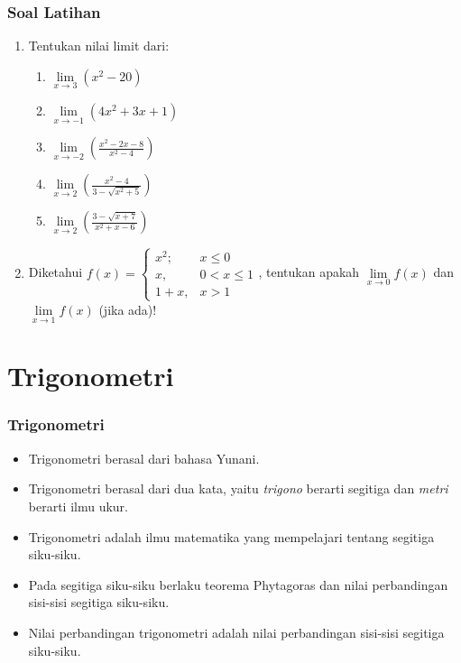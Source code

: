 \documentclass[pdflatex,compress,mathserif]{beamer}
\begin{document}
		\begin{frame}
			\frametitle{Soal Latihan}
			\begin{enumerate}
				\item Tentukan nilai limit dari:
				\begin{enumerate}
					\item $\lim\limits_{x \rightarrow 3} \left( x^2 - 20 \right)$
					\item $\lim\limits_{x \rightarrow -1} \left( 4x^2 + 3x + 1 \right)$
					\item $\lim\limits_{x \rightarrow -2} \left( \frac{x^2 - 2x - 8}{x^2 - 4} \right)$
					\item $\lim\limits_{x \rightarrow 2} \left( \frac{x^2 - 4}{3 - \sqrt{x^2+5}} \right)$
					\item $\lim\limits_{x \rightarrow 2} \left( \frac{3 - \sqrt{x+7}}{x^2 + x - 6} \right)$
				\end{enumerate}
				\item Diketahui $ f(x) = \begin{cases}
					x^2;	& x \leq 0 \\
					x, 		& 0 < x \leq 1 \\
					1 + x,	& x > 1
				\end{cases} $,
				tentukan apakah $ \lim\limits_{x \rightarrow 0} f(x) $ dan $ \lim\limits_{x \rightarrow 1} f(x) $ (jika ada)!
			\end{enumerate}
		\end{frame}
	
\section{Trigonometri}

	\begin{frame}
		\frametitle{Trigonometri}
		\begin{itemize}
			\item Trigonometri berasal dari bahasa Yunani.
			\item Trigonometri berasal dari dua kata, yaitu \textit{trigono} berarti segitiga dan \textit{metri} berarti ilmu ukur.
			\item Trigonometri adalah ilmu matematika yang mempelajari tentang segitiga siku-siku.
			\item Pada segitiga siku-siku berlaku teorema Phytagoras dan nilai perbandingan sisi-sisi segitiga siku-siku.
			\item Nilai perbandingan trigonometri adalah nilai perbandingan sisi-sisi segitiga siku-siku.
		\end{itemize}
	\end{frame}
\end{document}
